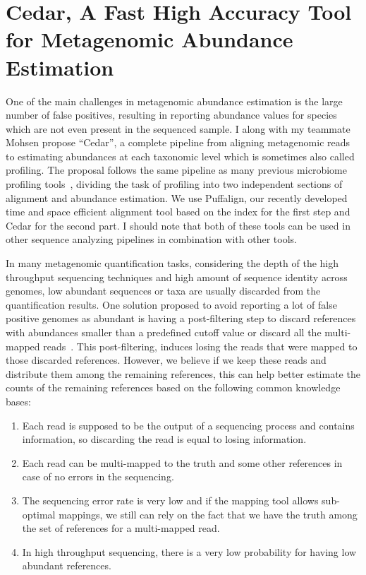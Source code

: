 \section{Cedar, A Fast High Accuracy Tool for Metagenomic Abundance Estimation}
One of the main challenges in metagenomic abundance estimation is the large number of
false positives, resulting in reporting abundance values for species
which are not even present in the sequenced sample.
I along with my teammate Mohsen propose ``Cedar'',
a complete pipeline from aligning metagenomic reads to estimating abundances at each taxonomic level
which is sometimes also called profiling.
The proposal follows the same pipeline as many previous microbiome profiling tools~\cite{},
dividing the task of profiling into two independent sections of alignment and abundance estimation.
We use Puffalign, our recently developed time and space efficient alignment tool
based on the \pufferfish index for the first step and Cedar for the second part.
I should note that both of these tools can be used in other sequence analyzing pipelines
in combination with other tools.

In many metagenomic quantification tasks,
considering the depth of the high throughput sequencing techniques
and high amount of sequence identity across genomes,
low abundant sequences or taxa are usually discarded from the quantification results.
One solution proposed to avoid reporting a lot of false positive genomes as abundant
is having a post-filtering step
to discard references with abundances smaller than a predefined cutoff value
or discard all the multi-mapped reads~\cite{bracken,karp}.
This post-filtering, induces losing the reads that were mapped to those discarded references.
However, we believe if we keep these reads and distribute them among the remaining references,
this can help better estimate the counts of the remaining references
based on the following common knowledge bases:
\begin{enumerate}
    \item Each read is supposed to be the output of a sequencing process and contains information,
    so discarding the read is equal to losing information.
    \item Each read can be multi-mapped to the truth and some other references
    in case of no errors in the sequencing.
    \item The sequencing error rate is very low and if the mapping tool allows sub-optimal mappings,
    we still can rely on the fact that we have the truth
    among the set of references for a multi-mapped read.
    \item In high throughput sequencing, there is a very low probability for having low abundant references.
\end{enumerate}

